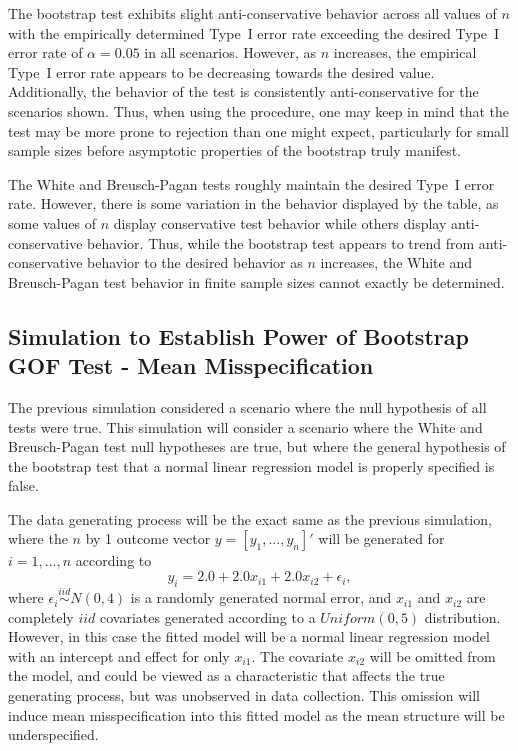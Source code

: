 		The bootstrap test exhibits slight anti-conservative behavior across all values of $n$ with the empirically determined Type~I error rate exceeding the desired Type~I error rate
		of $\alpha = 0.05$ in all scenarios. However, as $n$ increases, the empirical Type~I error rate appears to be decreasing towards the desired value. Additionally, the
		behavior of the test is consistently anti-conservative for the scenarios shown. Thus, when using the procedure, one may keep in mind that the test may be more prone to
		rejection than one might expect, particularly for small sample sizes before asymptotic properties of the bootstrap truly manifest.

		The White and Breusch-Pagan tests roughly maintain the desired Type~I error rate. However, there is some variation in the behavior displayed by the table, as some values
		of $n$ display conservative test behavior while others display anti-conservative behavior. Thus, while the bootstrap test appears to trend from anti-conservative behavior
		to the desired behavior as $n$ increases, the White and Breusch-Pagan test behavior in finite sample sizes cannot exactly be determined.

		\subsection{Simulation to Establish Power of Bootstrap GOF Test - Mean Misspecification}

		The previous simulation considered a scenario where the null hypothesis of all tests were true. This simulation will consider a scenario where the White and
		Breusch-Pagan test null hypotheses are true, but where the general hypothesis of the bootstrap test that a normal linear regression model is properly
		specified is false.

		The data generating process will be the exact same as the previous simulation, where the $n$ by 1 outcome vector $y = [y_1,...,y_n]'$ will be generated
		for $i = 1,...,n$ according to
		\begin{equation*}
			y_i = 2.0 + 2.0 x_{i1} + 2.0 x_{i2} + \epsilon_i , 
		\end{equation*}
		where $\epsilon_i \stackrel{iid}{\sim} N(0,4)$ is a randomly generated normal error, and $x_{i1}$ and $x_{i2}$ are completely $iid$ covariates generated according to
		a $Uniform(0,5)$ distribution. However, in this case the fitted model will be a normal linear regression model with an intercept and effect for only
		$x_{i1}$. The covariate $x_{i2}$ will be omitted from the model, and could be viewed as a characteristic that affects the true generating process, but
		was unobserved in data collection. This omission will induce mean misspecification into this fitted model as the mean structure will be underspecified.

